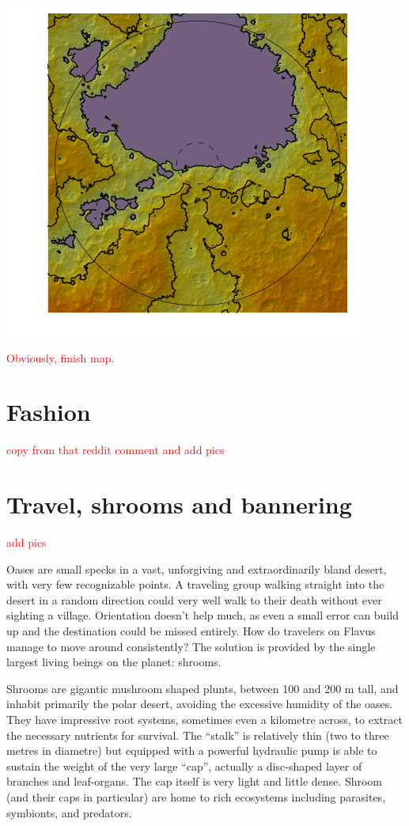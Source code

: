 \documentclass[10pt,oneside]{memoir}
\newcommand{\cmmnt}[1]{\textcolor{red}{#1}}
\begin{document}
\includegraphics{../maps/map/map.png}

\cmmnt{Obviously, finish map.}

\pagebreak

\section{Fashion}

\cmmnt{copy from that reddit comment and add pics}

\pagebreak

\section{Travel, shrooms and bannering}

\cmmnt{add pics}

Oases are small specks in a vast, unforgiving and extraordinarily bland desert, with very few recognizable points. A traveling group walking straight into the desert in a random direction could very well walk to their death without ever sighting a village. Orientation doesn't help much, as even a small error can build up and the destination could be missed entirely. How do travelers on Flavus manage to move around consistently? The solution is provided by the single largest living beings on the planet: shrooms.

Shrooms are gigantic mushroom shaped plunts, between 100 and 200 m tall, and inhabit primarily the polar desert, avoiding the excessive humidity of the oases. They have impressive root systems, sometimes even a kilometre across, to extract the necessary nutrients for survival. The ``stalk'' is relatively thin (two to three metres in diametre) but equipped with a powerful hydraulic pump is able to sustain the weight of the very large ``cap'', actually a disc-shaped layer of branches and leaf-organs. The cap itself is very light and little dense. Shroom (and their caps in particular) are home to rich ecosystems including parasites, symbionts, and predators.
\end{document}
